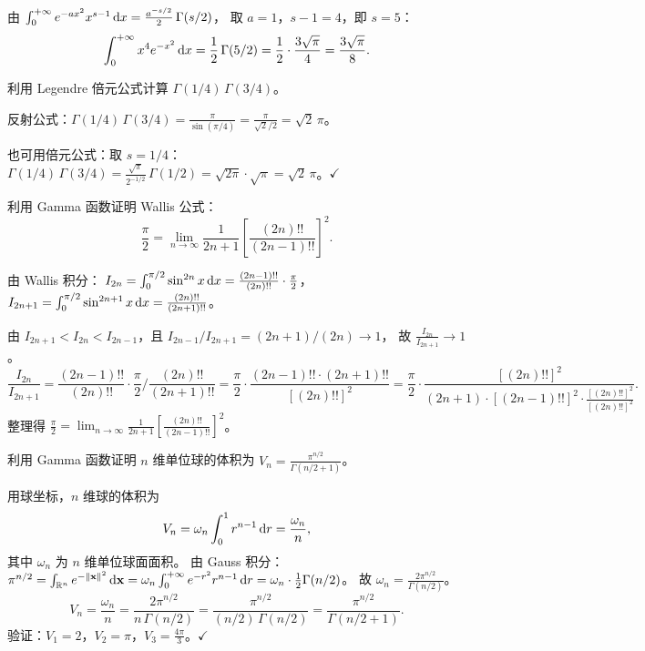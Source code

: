 \documentclass{ctexart}
\begin{document}
\begin{solution}
  由 $\int_0^{+\infty}e^{-ax^2}x^{s-1}\,\mathrm{d} x = \frac{a^{-s/2}}{2}\,\Gamma(s/2)$，
  取 $a = 1$，$s - 1 = 4$，即 $s = 5$：
  \[
    \int_0^{+\infty}x^4 e^{-x^2}\,\mathrm{d} x
    = \frac{1}{2}\,\Gamma(5/2)
    = \frac{1}{2}\cdot\frac{3\sqrt{\pi}}{4}
    = \frac{3\sqrt{\pi}}{8}.
  \]
\end{solution}

\begin{exercise}[倍元公式应用]
  利用 Legendre 倍元公式计算 $\Gamma(1/4)\,\Gamma(3/4)$。
\end{exercise}

\begin{solution}
  反射公式：$\Gamma(1/4)\,\Gamma(3/4) = \frac{\pi}{\sin(\pi/4)} = \frac{\pi}{\sqrt{2}/2} = \sqrt{2}\,\pi$。

  也可用倍元公式：取 $s = 1/4$：
  $\Gamma(1/4)\,\Gamma(3/4) = \frac{\sqrt{\pi}}{2^{-1/2}}\,\Gamma(1/2) = \sqrt{2\pi}\cdot\sqrt{\pi} = \sqrt{2}\,\pi$。$\checkmark$
\end{solution}

\begin{exercise}[综合——推导 Wallis 公式]
  利用 Gamma 函数证明 Wallis 公式：
  \[
    \frac{\pi}{2} = \lim_{n \to \infty}
    \frac{1}{2n+1}\left[\frac{(2n)!!}{(2n-1)!!}\right]^2.
  \]
\end{exercise}

\begin{solution}
  由 Wallis 积分：
  $I_{2n} = \int_0^{\pi/2}\sin^{2n}x\,\mathrm{d} x = \frac{(2n-1)!!}{(2n)!!}\cdot\frac{\pi}{2}$，
  $I_{2n+1} = \int_0^{\pi/2}\sin^{2n+1}x\,\mathrm{d} x = \frac{(2n)!!}{(2n+1)!!}$。

  由 $I_{2n+1} < I_{2n} < I_{2n-1}$，且 $I_{2n-1}/I_{2n+1} = (2n+1)/(2n) \to 1$，
  故 $\frac{I_{2n}}{I_{2n+1}} \to 1$。
  \[
    \frac{I_{2n}}{I_{2n+1}}
    = \frac{(2n-1)!!}{(2n)!!}\cdot\frac{\pi}{2}
      \bigg/ \frac{(2n)!!}{(2n+1)!!}
    = \frac{\pi}{2}\cdot\frac{(2n-1)!!\cdot(2n+1)!!}{[(2n)!!]^2}
    = \frac{\pi}{2}\cdot\frac{[(2n)!!]^2}{(2n+1)\cdot[(2n-1)!!]^2\cdot\frac{[(2n)!!]^2}{[(2n)!!]^2}}.
  \]
  整理得
  $\frac{\pi}{2} = \lim_{n\to\infty}\frac{1}{2n+1}\left[\frac{(2n)!!}{(2n-1)!!}\right]^2$。
\end{solution}

\begin{exercise}[综合——$n$ 维球体积]
  利用 Gamma 函数证明 $n$ 维单位球的体积为
  $V_n = \frac{\pi^{n/2}}{\Gamma(n/2+1)}$。
\end{exercise}

\begin{solution}
  用球坐标，$n$ 维球的体积为
  \[
    V_n = \omega_n \int_0^1 r^{n-1}\,\mathrm{d} r = \frac{\omega_n}{n},
  \]
  其中 $\omega_n$ 为 $n$ 维单位球面面积。
  由 Gauss 积分：
  $\pi^{n/2} = \int_{\mathbb{R}^n}e^{-\left\| \mathbf{x} \right\|^2}\,\mathrm{d}\mathbf{x}
  = \omega_n\int_0^{+\infty}e^{-r^2}r^{n-1}\,\mathrm{d} r
  = \omega_n\cdot\frac{1}{2}\Gamma(n/2)$。
  故 $\omega_n = \frac{2\pi^{n/2}}{\Gamma(n/2)}$。
  \[
    V_n = \frac{\omega_n}{n} = \frac{2\pi^{n/2}}{n\,\Gamma(n/2)}
    = \frac{\pi^{n/2}}{(n/2)\,\Gamma(n/2)}
    = \frac{\pi^{n/2}}{\Gamma(n/2+1)}.
  \]
  验证：$V_1 = 2$，$V_2 = \pi$，$V_3 = \frac{4\pi}{3}$。$\checkmark$
\end{solution}
\end{document}
